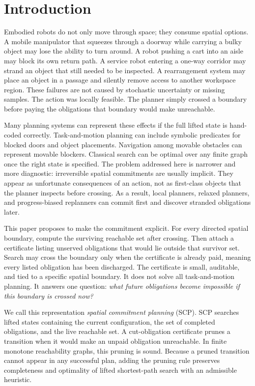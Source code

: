 \documentclass{article}
\begin{document}
\section{Introduction}

Embodied robots do not only move through space; they consume spatial options. A mobile manipulator that squeezes through a doorway while carrying a bulky object may lose the ability to turn around. A robot pushing a cart into an aisle may block its own return path. A service robot entering a one-way corridor may strand an object that still needed to be inspected. A rearrangement system may place an object in a passage and silently remove access to another workspace region. These failures are not caused by stochastic uncertainty or missing samples. The action was locally feasible. The planner simply crossed a boundary before paying the obligations that boundary would make unreachable.

Many planning systems can represent these effects if the full lifted state is hand-coded correctly. Task-and-motion planning can include symbolic predicates for blocked doors and object placements. Navigation among movable obstacles can represent movable blockers. Classical search can be optimal over any finite graph once the right state is specified. The problem addressed here is narrower and more diagnostic: irreversible spatial commitments are usually implicit. They appear as unfortunate consequences of an action, not as first-class objects that the planner inspects before crossing. As a result, local planners, relaxed planners, and progress-biased replanners can commit first and discover stranded obligations later.

This paper proposes to make the commitment explicit. For every directed spatial boundary, compute the surviving reachable set after crossing. Then attach a certificate listing unserved obligations that would lie outside that survivor set. Search may cross the boundary only when the certificate is already paid, meaning every listed obligation has been discharged. The certificate is small, auditable, and tied to a specific spatial boundary. It does not solve all task-and-motion planning. It answers one question: \emph{what future obligations become impossible if this boundary is crossed now?}

We call this representation \emph{spatial commitment planning} (SCP). SCP searches lifted states containing the current configuration, the set of completed obligations, and the live reachable set. A cut-obligation certificate prunes a transition when it would make an unpaid obligation unreachable. In finite monotone reachability graphs, this pruning is sound. Because a pruned transition cannot appear in any successful plan, adding the pruning rule preserves completeness and optimality of lifted shortest-path search with an admissible heuristic.
\end{document}
